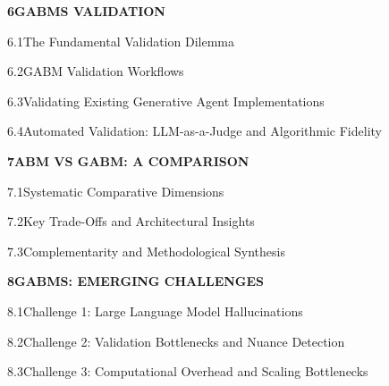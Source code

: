\documentclass[12pt,a4paper]{report}
\begin{document}
\noindent\textbf{6\quad GABMS VALIDATION}\dotfill\textbf{\pageref{chap:gabms_validation}}\par
\vspace{3pt}
\noindent\hspace{0.3in}6.1\quad The Fundamental Validation Dilemma\dotfill\pageref{sec:black_box_dilemma}\par
\vspace{2pt}
\noindent\hspace{0.3in}6.2\quad GABM Validation Workflows\dotfill\pageref{sec:validation_workflows}\par
\vspace{2pt}
\noindent\hspace{0.3in}6.3\quad Validating Existing Generative Agent Implementations\dotfill\pageref{sec:human_eval_studies}\par
\vspace{2pt}
\noindent\hspace{0.3in}6.4\quad Automated Validation: LLM-as-a-Judge and Algorithmic Fidelity\dotfill\pageref{sec:llm_as_judge}\par
\vspace{6pt}

\noindent\textbf{7\quad ABM VS GABM: A COMPARISON}\dotfill\textbf{\pageref{chap:abm_vs_gabm}}\par
\vspace{3pt}
\noindent\hspace{0.3in}7.1\quad Systematic Comparative Dimensions\dotfill\pageref{sec:comp_dimensions}\par
\vspace{2pt}
\noindent\hspace{0.3in}7.2\quad Key Trade-Offs and Architectural Insights\dotfill\pageref{sec:trade_offs}\par
\vspace{2pt}
\noindent\hspace{0.3in}7.3\quad Complementarity and Methodological Synthesis\dotfill\pageref{sec:complementarity}\par
\vspace{6pt}

\noindent\textbf{8\quad GABMS: EMERGING CHALLENGES}\dotfill\textbf{\pageref{chap:emerging_challenges}}\par
\vspace{3pt}
\noindent\hspace{0.3in}8.1\quad Challenge 1: Large Language Model Hallucinations\dotfill\pageref{sec:hallucinations}\par
\vspace{2pt}
\noindent\hspace{0.3in}8.2\quad Challenge 2: Validation Bottlenecks and Nuance Detection\dotfill\pageref{sec:val_bottlenecks}\par
\vspace{2pt}
\noindent\hspace{0.3in}8.3\quad Challenge 3: Computational Overhead and Scaling Bottlenecks\dotfill\pageref{sec:comp_bottlenecks}\par
\vspace{6pt}
\end{document}
